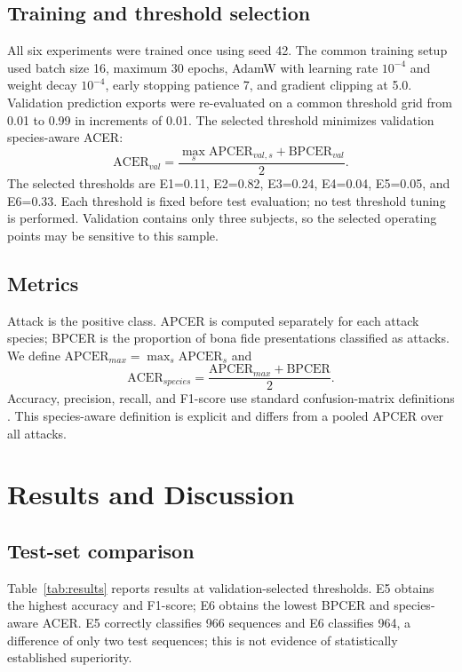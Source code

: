 \documentclass[a4paper,conference]{IEEEtran}
\begin{document}
\subsection{Training and threshold selection}
All six experiments were trained once using seed 42. The common training setup used batch size 16, maximum 30 epochs, AdamW with learning rate $10^{-4}$ and weight decay $10^{-4}$, early stopping patience 7, and gradient clipping at 5.0. Validation prediction exports were re-evaluated on a common threshold grid from 0.01 to 0.99 in increments of 0.01. The selected threshold minimizes validation species-aware ACER:
\begin{equation}
\mathrm{ACER}_{val}=\frac{\max_s\mathrm{APCER}_{val,s}+\mathrm{BPCER}_{val}}{2}.
\end{equation}
The selected thresholds are E1=0.11, E2=0.82, E3=0.24, E4=0.04, E5=0.05, and E6=0.33. Each threshold is fixed before test evaluation; no test threshold tuning is performed. Validation contains only three subjects, so the selected operating points may be sensitive to this sample.





\subsection{Metrics}
Attack is the positive class. APCER is computed separately for each attack species; BPCER is the proportion of bona fide presentations classified as attacks. We define $\mathrm{APCER}_{max}=\max_s\mathrm{APCER}_s$ and
\begin{equation}
\mathrm{ACER}_{species}=\frac{\mathrm{APCER}_{max}+\mathrm{BPCER}}{2}.
\end{equation}
Accuracy, precision, recall, and F1-score use standard confusion-matrix definitions \cite{sokolova2009}. This species-aware definition is explicit and differs from a pooled APCER over all attacks.

\section{Results and Discussion}
\subsection{Test-set comparison}
Table~\ref{tab:results} reports results at validation-selected thresholds. E5 obtains the highest accuracy and F1-score; E6 obtains the lowest BPCER and species-aware ACER. E5 correctly classifies 966 sequences and E6 classifies 964, a difference of only two test sequences; this is not evidence of statistically established superiority.
\end{document}

